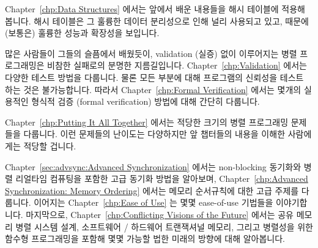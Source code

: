 Chapter~\ref{chp:Data Structures} 에서는 앞에서 배운 내용들을 해시 테이블에
적용해 봅니다.
해시 테이블은 그 훌륭한 데이터 분리성으로 인해 널리 사용되고 있고, 때문에
(보통은) 훌륭한 성능과 확장성을 보입니다.
\iffalse

Chapter~\ref{chp:Data Structures} applies the lessons of previous
chapters to hash tables, which are heavily used due
to their excellent partitionability, which (usually) leads to excellent
performance and scalability.
\fi

많은 사람들이 그들의 슬픔에서 배웠듯이, validation (실증) 없이 이루어지는 병렬
프로그래밍은 비참한 실패로의 분명한 지름길입니다.
Chapter~\ref{chp:Validation} 에서는 다양한 테스트 방법을 다룹니다.
물론 모든 부분에 대해 프로그램의 신뢰성을 테스트 하는 것은 불가능합니다.
따라서 Chapter~\ref{chp:Formal Verification} 에서는 몇개의 실용적인 형식적
검증 (formal verification) 방법에 대해 간단히 다룹니다.
\iffalse

As many have learned to their sorrow, parallel programming without
validation is a sure path to abject failure.
Chapter~\ref{chp:Validation} covers various forms of testing.
It is of course impossible to test reliability into your program
after the fact, so Chapter~\ref{chp:Formal Verification}
follows up with a brief overview of a couple of practical approaches to
formal verification.
\fi

Chapter~\ref{chp:Putting It All Together} 에서는 적당한 크기의 병렬 프로그래밍
문제들을 다룹니다.
이런 문제들의 난이도는 다양하지만 앞 챕터들의 내용을 이해한 사람에게는 적당할
겁니다.
\iffalse

Chapter~\ref{chp:Putting It All Together}
contains a series of moderate-sized parallel programming problems.
The difficulty of these problems vary, but should be appropriate for
someone who has mastered the material in the previous chapters.
\fi

Chapter~\ref{sec:advsync:Advanced Synchronization} 에서는 non-blocking 동기화와
병렬 리얼타임 컴퓨팅을 포함한 고급 동기화 방법을 알아보며,
Chapter~\ref{chp:Advanced Synchronization: Memory Ordering} 에서는 메모리
순서규칙에 대한 고급 주제를 다룹니다.
이어지는 Chapter~\ref{chp:Ease of Use} 는 몇몇 ease-of-use 기법들을
이야기합니다.
마지막으로, Chapter~\ref{chp:Conflicting Visions of the Future} 에서는 공유
메모리 병렬 시스템 설계, 소프트웨어 / 하드웨어 트랜잭셔널 메모리, 그리고
병렬성을 위한 함수형 프로그래밍을 포함해 몇몇 가능할 법한 미래의 방향에 대해
알아봅니다.
\iffalse

Chapter~\ref{sec:advsync:Advanced Synchronization}
looks at advanced synchronization methods, including
non-blocking synchronization and parallel real-time computing,
while Chapter~\ref{chp:Advanced Synchronization: Memory Ordering}
covers the advanced topic of memory ordering.
Chapter~\ref{chp:Ease of Use} follows up with some ease-of-use advice.
Finally, Chapter~\ref{chp:Conflicting Visions of the Future}
looks at a few possible future directions, including
shared-memory parallel system design, software and hardware transactional
memory, and functional programming for parallelism.
\fi

